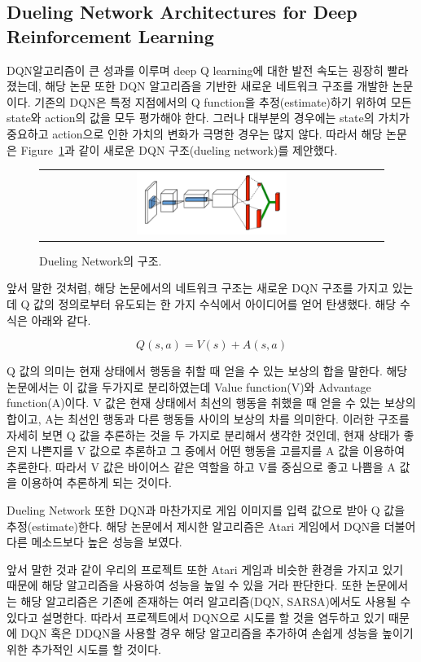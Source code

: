 \subsection{Dueling Network Architectures for Deep Reinforcement Learning}
DQN알고리즘이 큰 성과를 이루며 deep Q learning에 대한 발전 속도는 굉장히 빨라졌는데, 해당 논문 또한 DQN 알고리즘을 기반한 새로운 네트워크 구조를 개발한 논문이다. 
기존의 DQN은 특정 지점에서의 Q function을 추정(estimate)하기 위하여 모든 state와 action의 값을 모두 평가해야 한다. 
그러나 대부분의 경우에는 state의 가치가 중요하고 action으로 인한 가치의 변화가 극명한 경우는 많지 않다. 
따라서 해당 논문은 Figure~\ref{fig:dueling_network}과 같이 새로운 DQN 구조(dueling network)를 제안했다.

\begin{figure}[h]
\begin{center}
\begin{tabular}{c}
     \includegraphics[width=0.45\textwidth]{FIG/DuelingNetwork.png} \\
\end{tabular}
\caption{
	Dueling Network의 구조.
}
\label{fig:dueling_network}
\end{center}
\end{figure}

앞서 말한 것처럼, 해당 논문에서의 네트워크 구조는 새로운 DQN 구조를 가지고 있는데 Q 값의 정의로부터 유도되는 한 가지 수식에서 아이디어를 얻어 탄생했다. 
해당 수식은 아래와 같다. 

$$Q(s,a) = V(s) + A(s,a)$$

Q 값의 의미는 현재 상태에서 행동을 취할 때 얻을 수 있는 보상의 합을 말한다. 
해당 논문에서는 이 값을 두가지로 분리하였는데 Value function(V)와 Advantage function(A)이다. 
V 값은 현재 상태에서 최선의 행동을 취했을 때 얻을 수 있는 보상의 합이고, A는 최선인 행동과 다른 행동들 사이의 보상의 차를 의미한다. 
이러한 구조를 자세히 보면 Q 값을 추론하는 것을 두 가지로 분리해서 생각한 것인데, 현재 상태가 좋은지 나쁜지를 V 값으로 추론하고 그 중에서 어떤 행동을 고를지를 A 값을 이용하여 추론한다. 
따라서 V 값은 바이어스 같은 역할을 하고 V를 중심으로 좋고 나쁨을 A 값을 이용하여 추론하게 되는 것이다. 

Dueling Network 또한 DQN과 마찬가지로 게임 이미지를 입력 값으로 받아 Q 값을 추정(estimate)한다. 
해당 논문에서 제시한 알고리즘은 Atari 게임에서 DQN을 더불어 다른 메소드보다 높은 성능을 보였다.

앞서 말한 것과 같이 우리의 프로젝트 또한 Atari 게임과 비슷한 환경을 가지고 있기 때문에 해당 알고리즘을 사용하여 성능을 높일 수 있을 거라 판단한다. 
또한 논문에서는 해당 알고리즘은 기존에 존재하는 여러 알고리즘(DQN, SARSA)에서도 사용될 수 있다고 설명한다. 
따라서 프로젝트에서 DQN으로 시도를 할 것을 염두하고 있기 때문에 DQN 혹은 DDQN을 사용할 경우 해당 알고리즘을 추가하여 손쉽게 성능을 높이기 위한 추가적인 시도를 할 것이다.
